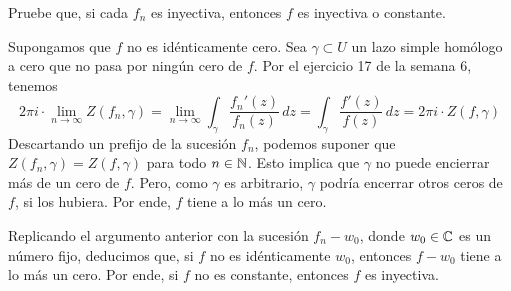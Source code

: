 \begin{exercise}
Pruebe que, si cada $f_n$ es inyectiva, entonces $f$ es inyectiva o constante.
\end{exercise}

\begin{solution}
Supongamos que $f$ no es idénticamente cero. Sea $\gamma \subset U$ un lazo simple homólogo a cero que no pasa por ningún cero de $f$. Por el ejercicio 17 de la semana 6, tenemos
$$
2\pi i \cdot \lim_{n \to \infty} Z(f_n, \gamma)
    = \lim_{n \to \infty} \int_\gamma \frac {f_n'(z)} {f_n(z)} \, dz
    = \int_\gamma \frac {f'(z)} {f(z)} \, dz
    = 2\pi i \cdot Z(f, \gamma)
$$
Descartando un prefijo de la sucesión $f_n$, podemos suponer que $Z(f_n, \gamma) = Z(f, \gamma)$ para todo $n \in \mathbb N$. Esto implica que $\gamma$ no puede encierrar más de un cero de $f$. Pero, como $\gamma$ es arbitrario, $\gamma$ podría encerrar otros ceros de $f$, si los hubiera. Por ende, $f$ tiene a lo más un cero.

Replicando el argumento anterior con la sucesión $f_n - w_0$, donde $w_0 \in \mathbb C$ es un número fijo, deducimos que, si $f$ no es idénticamente $w_0$, entonces $f - w_0$ tiene a lo más un cero. Por ende, si $f$ no es constante, entonces $f$ es inyectiva.
\end{solution}
